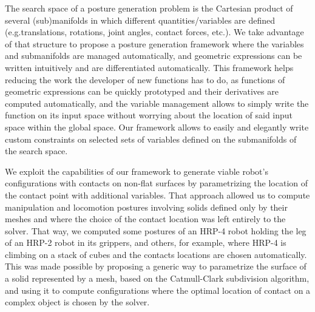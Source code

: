 The search space of a posture generation problem is the Cartesian product of several (sub)manifolds in which different quantities/variables are defined (e.g.translations, rotations, joint angles, contact forces, etc.).
We take advantage of that structure to propose a posture generation framework where the variables and submanifolds are managed automatically, and geometric expressions can be written intuitively and are differentiated automatically.
This framework helps reducing the work the developer of new functions has to do, as functions of geometric expressions can be quickly prototyped and their derivatives are computed automatically, and the variable management allows to simply write the function on its input space without worrying about the location of said input space within the global space.
Our framework allows to easily and elegantly write custom constraints on selected sets of variables defined on the submanifolds of the search space.

We exploit the capabilities of our framework to generate viable robot's configurations with contacts on non-flat surfaces by parametrizing the location of the contact point with additional variables.
That approach allowed us to compute manipulation and locomotion postures involving solids defined only by their meshes and where the choice of the contact location was left entirely to the solver.
That way, we computed some postures of an HRP-4 robot holding the leg of an HRP-2 robot in its grippers, and others, for example, where HRP-4 is climbing on a stack of cubes and the contacts locations are chosen automatically.
This was made possible by proposing a generic way to parametrize the surface of a solid represented by a mesh, based on the Catmull-Clark subdivision algorithm, and using it to compute configurations where the optimal location of contact on a complex object is chosen by the solver.

